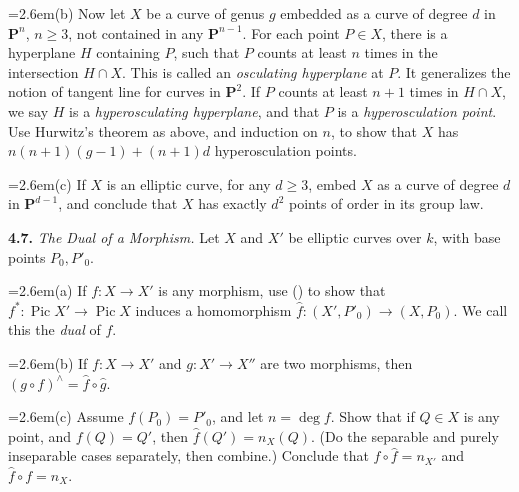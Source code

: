 {\noindent\hangindent=2.6em\hspace*{1.4em}(b) Now let $X$ be a curve of genus $g$ embedded as a curve of degree $d$ in $\mathbf P^n$, $n\ge3$, not contained in any $\mathbf P^{n-1}$. For each point $P\in X$, there is a hyperplane $H$ containing $P$, such that $P$ counts at least $n$ times in the intersection $H\cap X$. This is called an \emph{osculating hyperplane} at $P$. It generalizes the notion of tangent line for curves in $\mathbf P^2$. If $P$ counts at least $n+1$ times in $H\cap X$, we say $H$ is a \emph{hyperosculating hyperplane}, and that $P$ is a \emph{hyperosculation point}. Use Hurwitz's theorem as above, and induction on $n$, to show that $X$ has $n(n+1)(g-1)+(n+1)d$ hyperosculation points.

\noindent\hangindent=2.6em\hspace*{1.4em}(c) If $X$ is an elliptic curve, for any $d\ge3$, embed $X$ as a curve of degree $d$ in $\mathbf P^{d-1}$, and conclude that $X$ has exactly $d^2$ points of order  in its group law.

\smallskip
\noindent\hypertarget{ex-IV-4.7}{}\textbf{4.7.} \emph{The Dual of a Morphism.} Let $X$ and $X'$ be elliptic curves over $k$, with base points $P_0,P'_0$.

\noindent\hangindent=2.6em\hspace*{1.4em}(a) If $f\colon X\to X'$ is any morphism, use () to show that $f^*\colon\operatorname{Pic}X'\to\operatorname{Pic}X$ induces a homomorphism $\widehat f\colon(X',P'_0)\to(X,P_0)$. We call this the \emph{dual} of $f$.

\noindent\hangindent=2.6em\hspace*{1.4em}(b) If $f\colon X\to X'$ and $g\colon X'\to X''$ are two morphisms, then $(g\circ f)^\wedge=\widehat f\circ\widehat g$.

\noindent\hangindent=2.6em\hspace*{1.4em}(c) Assume $f(P_0)=P'_0$, and let $n=\deg f$. Show that if $Q\in X$ is any point, and $f(Q)=Q'$, then $\widehat f(Q')=n_X(Q)$. (Do the separable and purely inseparable cases separately, then combine.) Conclude that $f\circ\widehat f=n_{X'}$ and $\widehat f\circ f=n_X$.

}
